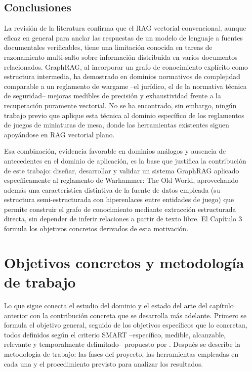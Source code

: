 \documentclass[11pt,a4paper,spanish]{book}
\numberwithin{equation}{chapter}
\numberwithin{figure}{chapter}
\numberwithin{table}{chapter}
\begin{document}
\section{Conclusiones}

La revisión de la literatura confirma que el RAG vectorial convencional, aunque eficaz en general para anclar las respuestas de un modelo de lenguaje a fuentes documentales verificables, tiene una limitación conocida en tareas de razonamiento multi-salto sobre información distribuida en varios documentos relacionados. GraphRAG, al incorporar un grafo de conocimiento explícito como estructura intermedia, ha demostrado en dominios normativos de complejidad comparable a un reglamento de wargame --el jurídico, el de la normativa técnica de seguridad-- mejoras medibles de precisión y exhaustividad frente a la recuperación puramente vectorial. No se ha encontrado, sin embargo, ningún trabajo previo que aplique esta técnica al dominio específico de los reglamentos de juegos de miniaturas de mesa, donde las herramientas existentes siguen apoyándose en RAG vectorial plano.

Esa combinación, evidencia favorable en dominios análogos y ausencia de antecedentes en el dominio de aplicación, es la base que justifica la contribución de este trabajo: diseñar, desarrollar y validar un sistema GraphRAG aplicado específicamente al reglamento de Warhammer: The Old World, aprovechando además una característica distintiva de la fuente de datos empleada (su estructura semi-estructurada con hiperenlaces entre entidades de juego) que permite construir el grafo de conocimiento mediante extracción estructurada directa, sin depender de inferir relaciones a partir de texto libre. El Capítulo 3 formula los objetivos concretos derivados de esta motivación.


\chapter{Objetivos concretos y metodología de trabajo}

Lo que sigue conecta el estudio del dominio y el estado del arte del capítulo anterior con la contribución concreta que se desarrolla más adelante. Primero se formula el objetivo general, seguido de los objetivos específicos que lo concretan, todos definidos según el criterio SMART --específico, medible, alcanzable, relevante y temporalmente delimitado-- propuesto por . Después se describe la metodología de trabajo: las fases del proyecto, las herramientas empleadas en cada una y el procedimiento previsto para analizar los resultados.
\end{document}

